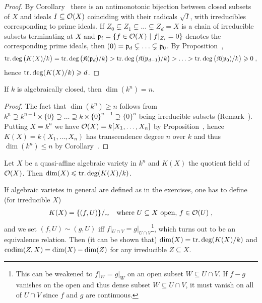 \documentclass[a4paper,parskip=half,numbers=enddot, DIV=12]{scrreprt}
\renewcommand{\geq}{\geqslant}
\renewcommand{\leq}{\leqslant}
\begin{document}
	\begin{proof}
		By Corollary~ there is an antimonotonic bijection between closed subsets of $X$ and ideals $I\subseteq\mathcal{O}(X)$ coinciding with their radicals $\sqrt{I}$, with irreducibles corresponding to prime ideals. If $Z_0\subsetneq Z_1\subsetneq\ldots\subsetneq Z_d=X$ is a chain of irreducible subsets terminating at $X$ and $\mathfrak{p}_i=\left\{f\in\mathcal{O}(X)\ \middle|\  f|_{Z_i}=0\right\}$ denotes the corresponding prime ideals, then $(0)=\mathfrak{p}_d\subsetneq\ldots\subsetneq\mathfrak{p}_0$. By Proposition~,
		\begin{align*}
			\trdeg\big(K(X)/k\big)=\trdeg\big (\KK(\pp_d)/k\big)>\trdeg \big(\KK(\pp_{d-1})/k\big)>\ldots>\trdeg \big(\KK(\pp_0)/k\big)\geq 0\;,
		\end{align*}
		hence $\trdeg(K(X)/k)\geq d$.
	\end{proof}
	\begin{cor}
		If $k$ is algebraically closed, then $\dim(k^n) = n$.
	\end{cor}
	\begin{proof}
		The fact that $\dim (k^n) \geq n$ follows from $k^n\supsetneq k^{n-1}\times\{0\}\supsetneq \ldots\supseteq k\times\{0\}^{n-1}\supsetneq \{0\}^n$ being irreducible subsets (Remark~). Putting $X=k^n$ we have $\mathcal{O}(X)=k[X_1,\ldots,X_n]$ by Proposition~, hence $K(X) = k(X_1,\ldots,X_n)$ has transcendence degree $n$ over $k$ and thus $\dim(k^n)\leq n$  by Corollary~.
	\end{proof}
	\begin{cor}
		Let $X$ be a quasi-affine algebraic variety in $k^n$ and $K(X)$ the quotient field of $\mathcal{O}(X)$. Then $\dim (X)\leq \trdeg (K(X)/k)$.
	\end{cor}
	\begin{rem*}
		If algebraic varietes in general are defined as in the exercises, one has to define (for irreducible $X$)
		\begin{align*}
			K(X)=\{(f,U)\}/_\sim\quad\text{where }U\subseteq X\text{ open, }f\in\mathcal{O}(U)\;,
		\end{align*}
		and we set $(f,U)\sim(g,U)$ iff $f|_{U\cap V}=g|_{U\cap V}$\footnote{This can be weakened to $f|_W=g|_W$ on an open subset $W\subseteq U\cap V$. If $f-g$ vanishes on the open and thus dense subset $W\subseteq U\cap V$, it must vanish on all of $U\cap V$ since $f$ and $g$ are continuous.}, which turns out to be an equivalence relation. Then (it can be shown that) $\dim (X)=\operatorname{tr.deg}(K(X)/k)$ and $\operatorname{codim}(Z,X)=\dim (X)-\dim (Z)$ for any irreducible $Z\subseteq X$.
	\end{rem*}
\end{document}
